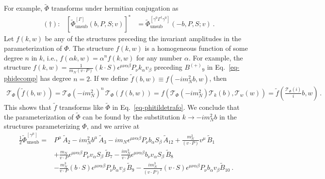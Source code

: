 \documentclass[]{article}
\numberwithin{equation}{section}
\newcommand{\GammaOp}{\Gamma}
\newcommand{\tcdot}{{\cdot}}
\newcommand{\tAmp}{\widetilde{A}}
\newcommand{\tBmp}{\widetilde{B}}
\newcommand{\tAmp}{\ensuremath{\widetilde{A}^{(+)}}}
\newcommand{\tBmp}{\ensuremath{\widetilde{B}^{(+)}}}
\newcommand{\Bmp}{\ensuremath{B^{(+)}}}
\newcommand{\mN}{m_N}
\newcommand{\kei}{k}
\newcommand{\elll}{b}
\begin{document}
For example, $\tilde \Phi$ transforms under hermitian conjugation as
\begin{align}
	&(\dagger): &\left[ \widetilde{\Phi}^{[\GammaOp]}_{\text{unsub}}(\elll,P,S;v)  \right]^* 
	&= \widetilde{\Phi}^{[\gamma^0 \GammaOp^\dagger \gamma^0]}_{\text{unsub}}(-\elll,P,S;v)  \ .\label{eq-conhermtilde}
\end{align}
Let $f(\kei,w)$ be any of the structures preceding the invariant amplitudes in the parameterization of $\Phi$.
The structure $f(\kei,w)$ is a homogeneous function of some degree $n$ in $\kei$, i.e., $f(\alpha \kei,w) = \alpha^n f(\kei,w)$ for any number $\alpha$. 
For example, the structure $f(\kei,w) = \frac{1}{\mN (v \tcdot P)} (\kei \tcdot S) \epsilon^{\mu \nu \alpha \beta} P_\nu \kei_\alpha v_\beta$ preceding $\Bmp_9$ in Eq.\ \eqref{eq-phidecomp} has degree $n=2$.
If we define $\tilde f(\elll,w) \equiv f(- i \mN^2 \elll,w)$, then 
\begin{align}
	\mathcal{T}_\Phi\left( \tilde f(\elll, w) \right) =
	\mathcal{T}_\Phi(-i \mN^2)^n\, \mathcal{T}_\Phi\left( f( \elll, w) \right) =
	f\left( \mathcal{T}_\Phi(-i \mN^2) \mathcal{T}_\kei(\elll) , \mathcal{T}_w(w) \right) =
	\tilde f \left(  \frac{\mathcal{T}_\Phi(i)}{i} \elll, w \right)\, .
	\end{align}
This shows that $\tilde f$ transforms like $\widetilde \Phi$ in Eq.\ \eqref{eq-phitildetrafo}.
We conclude that the parameterization of $\widetilde{\Phi}$ can be found by the substitution $\kei \rightarrow -i \mN^2 \elll$ in the structures parameterizing $\Phi$, and we arrive at 
\begin{align}  \frac{1}{2}\widetilde \Phi^{[\gamma^\mu]}_{\text{unsub}}  = & P^\mu\, \tAmp_2 - i \mN^2 \elll^\mu\, \tAmp_3 - i \mN \epsilon^{\mu \nu \alpha \beta} P_\nu \elll_\alpha S_\beta\, \tAmp_{12} + \frac{\mN^2}{(v \tcdot P)} v^\mu\, \tBmp_1\nonumber\\
& + \frac{\mN}{v \tcdot P} \epsilon^{\mu \nu \alpha \beta} P_\nu v_\alpha S_\beta\, \tBmp_7  - \frac{ i \mN^3}{v \tcdot P} \epsilon^{\mu \nu \alpha \beta} \elll_\nu v_\alpha S_\beta\, \tBmp_8 \nonumber\\
& - \frac{\mN^3}{v \tcdot P} (\elll \tcdot S) \epsilon^{\mu \nu \alpha \beta} P_\nu \elll_\alpha v_\beta\, \tBmp_9  - \frac{i \mN^3}{(v \tcdot P)^2} (v \tcdot S) \epsilon^{\mu \nu \alpha \beta} P_\nu \elll_\alpha v_\beta \tBmp_{10}\ . 
\label{eq-phitildedecomp}
\end{align}
\end{document}
